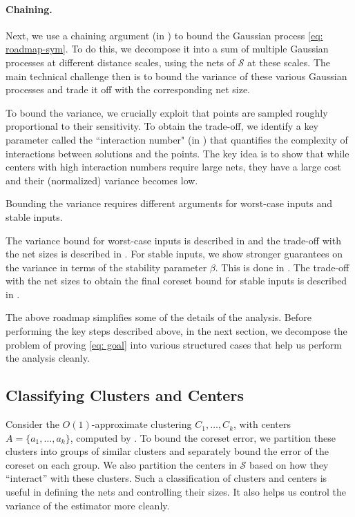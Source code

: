 \documentclass[11pt]{article}
\theoremstyle{restate}
\theoremstyle{definition}
\begin{document}
\paragraph{Chaining. } Next, we use a chaining argument  (in ) to bound the Gaussian process \eqref{eq: roadmap-sym}. To do this, we decompose it into a sum of multiple Gaussian processes at different distance scales,
using the nets of $\mathcal{S}$ at these scales. The main technical challenge then is to bound the variance of these various Gaussian processes and trade it off with the corresponding net size.


To bound the variance, we crucially exploit that points are sampled roughly proportional to their sensitivity.
To obtain the trade-off, we identify a key parameter called the ``interaction number" (in ) that quantifies the complexity of interactions between solutions and the points. The key idea is to show that while centers with high interaction numbers require large nets, they have a large cost and their (normalized) variance becomes low.

Bounding the variance requires different arguments for worst-case inputs and stable inputs.
 
The variance bound for worst-case inputs is described in  and the trade-off with the net sizes is described in .
For stable inputs, we show stronger guarantees on the variance in terms of the stability parameter $\beta$. This is done in . The trade-off with the net sizes to obtain the final coreset bound for stable inputs is described in . 


The above roadmap simplifies some of the details of the analysis. Before performing the key steps described above, in the next section, we decompose the problem of proving \eqref{eq: goal} into various structured cases that help us perform the analysis cleanly. 





\subsection{Classifying Clusters and Centers}\label{sec: classifying}
Consider the $O(1)$-approximate clustering $ C_1, \ldots, C_k$, with centers  $A = \{ a_1, \ldots, a_k \}$, computed by . To bound the coreset error, we partition these clusters into groups of similar clusters and separately bound the error of the coreset on each group.  We also partition the centers in $\mathcal{S}$  based on how they ``interact'' with these clusters.   Such a classification of clusters and centers is useful in defining the nets and controlling their sizes. It also helps us control the variance of the estimator more cleanly.
\end{document}
